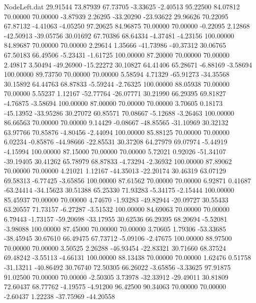 \begin{filecontents}{NodeLeft.dat}
  29.91544   73.87939   67.73705    -3.33625   -2.40513   95.22500   84.07812   70.00000   70.00000   -3.87939    2.26295  -33.20290  -23.93622
  29.96626   70.22095   67.87132    -4.41063   -4.05250   97.20625   84.96875   70.00000   70.00000   -0.22095    2.12868  -42.50913  -39.05756
  30.01692   67.70386   68.64334    -4.37481   -4.23156  100.00000   84.89687   70.00000   70.00000    2.29614    1.35666  -41.73986  -40.37312
  30.06765   67.50183   66.49506    -5.23431   -1.61725  100.00000   87.20000   70.00000   70.00000    2.49817    3.50494  -49.26900  -15.22272
  30.10827   64.41406   65.28671    -6.88169   -3.58694  100.00000   89.73750   70.00000   70.00000    5.58594    4.71329  -65.91273  -34.35568
  30.15892   64.44763   68.87833    -5.59244   -2.76325  100.00000   88.05938   70.00000   70.00000    5.55237    1.12167  -52.77764  -26.07771
  30.21990   66.29395   69.81827    -4.76875   -3.58694  100.00000   87.00000   70.00000   70.00000    3.70605    0.18173  -45.13952  -33.95286
  30.27072   60.85571   70.08667    -5.12688   -3.26463  100.00000   86.66563   70.00000   70.00000    9.14429   -0.08667  -48.85565  -31.10969
  30.32132   63.97766   70.85876    -4.80456   -2.44094  100.00000   85.88125   70.00000   70.00000    6.02234   -0.85876  -44.98666  -22.85531
  30.37208   64.27979   69.07974    -5.44919   -4.15994  100.00000   87.15000   70.00000   70.00000    5.72021    0.92026  -51.34107  -39.19405
  30.41262   65.78979   68.87833    -4.73294   -2.36932  100.00000   87.89062   70.00000   70.00000    4.21021    1.12167  -44.35013  -22.20174
  30.46319   63.07129   69.58313    -6.77425   -3.65856  100.00000   87.61562   70.00000   70.00000    6.92871    0.41687  -63.24414  -34.15623
  30.51388   65.25330   71.93283    -5.34175   -2.15444  100.00000   85.45937   70.00000   70.00000    4.74670   -1.93283  -49.82944  -20.09727
  30.55433   63.20557   71.73157    -6.27287   -3.51532  100.00000   84.69063   70.00000   70.00000    6.79443   -1.73157  -59.20698  -33.17955
  30.62536   66.29395   68.20694    -5.52081   -3.98088  100.00000   87.45000   70.00000   70.00000    3.70605    1.79306  -53.33685  -38.45945
  30.67610   66.49475   67.73712    -5.09106   -2.47675  100.00000   88.97500   70.00000   70.00000    3.50525    2.26288  -46.93454  -22.83321
  30.71660   68.37524   69.48242    -3.55113   -4.66131  100.00000   88.13438   70.00000   70.00000    1.62476    0.51758  -31.13211  -40.86492
  30.76740   72.50305   66.26022    -3.65856   -3.33625   97.91875   91.02500   70.00000   70.00000   -2.50305    3.73978  -32.33912  -29.49011
  30.81809   72.60437   68.77762    -4.19575   -4.91200   96.42500   90.34063   70.00000   70.00000   -2.60437    1.22238  -37.75969  -44.20558

\end{filecontents}
